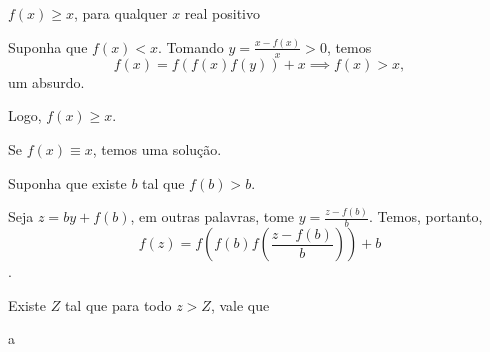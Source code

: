 \begin{lem*}
    $f(x)\geq x$, para qualquer $x$ real positivo
\end{lem*}

\begin{dem}
	Suponha que $f(x) < x$. Tomando $y = \frac{x - f(x)}{x} > 0$, temos $$ f(x) = f(f(x)f(y)) + x \implies f(x) > x,$$ um absurdo.

	Logo, $f(x) \ge x$.
\end{dem}

Se $f(x) \equiv x$, temos uma solução.

Suponha que existe $b$ tal que $f(b) > b$.

Seja $z = by + f(b)$, em outras palavras, tome $y = \frac{z - f(b)}{b}$. Temos, portanto, $$f(z) = f\left(f\left(b\right)f\left(\frac{z - f(b)}{b}\right)\right) + b$$.

\begin{lem*}
Existe $Z$ tal que para todo $z > Z$, vale que $$ $$
\end{lem*}

\begin{dem}
a	
\end{dem}

